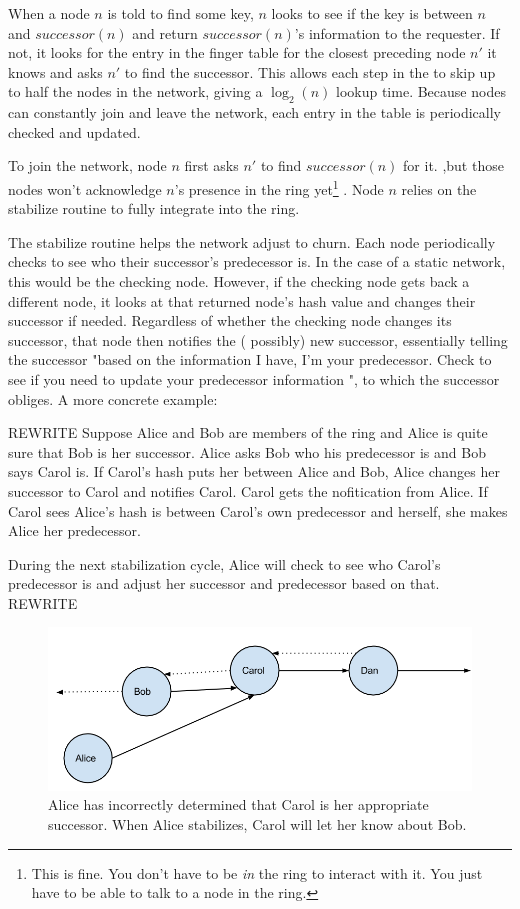 \documentclass[conference, compsocconf, letterpaper]{IEEEtran}
\begin{document}
When a node $n$ is told to find some key, $n$ looks to see if the key is between $n$ and $successor(n)$ and return $successor(n)$'s information to the requester. If not, it looks for the entry in the finger table for the closest preceding node $n'$ it knows and asks $n'$ to find the successor.  This allows each step in the to skip up to half the nodes in the network, giving a $\log_2(n)$ lookup time.  Because nodes can constantly join and leave the network, each entry in the table is periodically checked and updated. 

To join the network, node $n$ first asks $n'$ to find $successor(n)$ for it.  ,but those nodes won't  acknowledge $n$'s presence in the ring yet\footnote{This is fine. You don't have to be \emph{in} the ring to interact with it.  You just have to be able to talk to a node in the ring.} .  Node $n$ relies on the stabilize routine to fully integrate into the ring.

The stabilize routine helps the network adjust to churn. Each node periodically checks to see who their successor's predecessor is.  In the case of a static network, this would be the checking node.  However, if the checking node gets back a different node, it looks at that returned node's hash value and changes their successor if needed.  Regardless of whether the checking node changes its successor, that node then notifies the ( possibly) new successor,  essentially telling the successor "based on the information I have, I'm your predecessor.  Check to see if you need to update your predecessor information ", to which the successor obliges.  A more concrete example:


REWRITE
Suppose Alice and Bob are members of the ring and Alice is quite sure that Bob is her successor.  Alice asks Bob who his predecessor is and Bob says Carol is.  If Carol's hash puts her between Alice and Bob, Alice changes her successor to Carol and notifies Carol.  Carol gets the nofitication from Alice.  If Carol sees Alice's hash is between Carol's own predecessor and herself, she makes Alice her predecessor. 

During the next stabilization cycle, Alice will check to see who Carol's predecessor is and adjust her successor and predecessor based on that.
REWRITE

\begin{figure}
    \includegraphics[width=\linewidth]{abcd1}
    \caption{Alice has incorrectly determined that Carol is her appropriate successor.  When Alice stabilizes, Carol will let her know about Bob.}
    \label{abcd1}
\end{figure}
\end{document}
